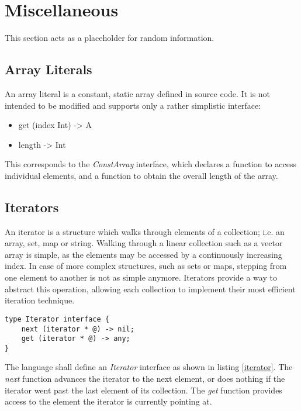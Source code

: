 \section{Miscellaneous}

This section acts as a placeholder for random information.

\subsection{Array Literals}

An array literal is a constant, static array defined in source code. It is not intended to be modified and supports only a rather simplistic interface:

\begin{itemize}
  \item get (index Int) -> A
  \item length -> Int
\end{itemize}

This corresponds to the \emph{ConstArray} interface, which declares a function to access individual elements, and a function to obtain the overall length of the array.


\subsection{Iterators}

An iterator is a structure which walks through elements of a collection; i.e. an array, set, map or string. Walking through a linear collection such as a vector array is simple, as the elements may be accessed by a continuously increasing index. In case of more complex structures, such as sets or maps, stepping from one element to another is not as simple anymore. Iterators provide a way to abstract this operation, allowing each collection to implement their most efficient iteration technique.

\begin{lstlisting}[float,caption=Iterator interface definition,label=iterator]
type Iterator interface {
	next (iterator * @) -> nil;
	get (iterator * @) -> any;
}
\end{lstlisting}

The language shall define an \emph{Iterator} interface as shown in listing \ref{iterator}. The \emph{next} function advances the iterator to the next element, or does nothing if the iterator went past the last element of its collection. The \emph{get} function provides access to the element the iterator is currently pointing at.